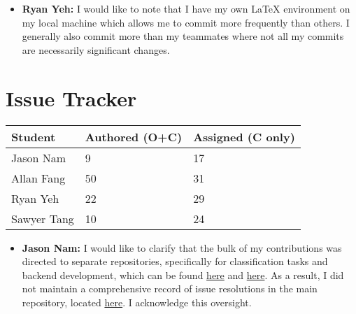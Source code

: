 \documentclass{article}
\begin{document}

\begin{itemize}
  \item \textbf{Ryan Yeh:} I would like to note that I have my own \LaTeX{} environment on my local machine
  which allows me to commit more frequently than others. I generally also commit more than my teammates where
  not all my commits are necessarily significant changes.
\end{itemize}


\section{Issue Tracker}


\begin{table}[H]
\centering
\begin{tabular}{lll}
\toprule
\textbf{Student} & \textbf{Authored (O+C)} & \textbf{Assigned (C only)}\\
\midrule
Jason Nam & 9 & 17 \\
Allan Fang & 50 & 31 \\
Ryan Yeh & 22 & 29 \\
Sawyer Tang & 10 & 24 \\
\bottomrule
\end{tabular}
\end{table}


\begin{itemize}
  \item \textbf{Jason Nam:} I would like to clarify that the bulk of my contributions was directed to separate repositories, specifically for classification tasks and backend development, which can be found \href{https://github.com/grocery-spending-tracker/grocery-spending-tracker-classification}{here} and \href{https://github.com/grocery-spending-tracker/grocery-spending-tracker-backend}{here}. As a result, I did not maintain a comprehensive record of issue resolutions in the main repository, located \href{https://github.com/r-yeh/grocery-spending-tracker}{here}. I acknowledge this oversight.
\end{itemize}
\end{document}
